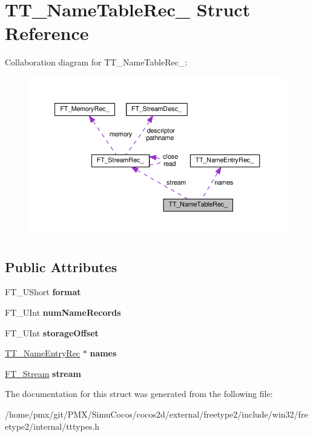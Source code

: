 \hypertarget{structTT__NameTableRec__}{}\section{T\+T\+\_\+\+Name\+Table\+Rec\+\_\+ Struct Reference}
\label{structTT__NameTableRec__}


Collaboration diagram for T\+T\+\_\+\+Name\+Table\+Rec\+\_\+\+:
\nopagebreak
\begin{figure}[H]
\begin{center}
\leavevmode
\includegraphics[width=350pt]{structTT__NameTableRec____coll__graph}
\end{center}
\end{figure}
\subsection*{Public Attributes}
\begin{DoxyCompactItemize}
\item 
\mbox{\label{structTT__NameTableRec___a762c5431cbe285cb7153bb5650710fb0}} 
F\+T\+\_\+\+U\+Short {\bfseries format}
\item 
\mbox{\label{structTT__NameTableRec___a5b565d940b9d02bb69cd19da5cda61b8}} 
F\+T\+\_\+\+U\+Int {\bfseries num\+Name\+Records}
\item 
\mbox{\label{structTT__NameTableRec___a4ed1f4e78e39b2e206411e9ea4d23801}} 
F\+T\+\_\+\+U\+Int {\bfseries storage\+Offset}
\item 
\mbox{\label{structTT__NameTableRec___ae8410a767073a6888bcb414a0cd052b8}} 
\hyperlink{structTT__NameEntryRec__}{T\+T\+\_\+\+Name\+Entry\+Rec} $\ast$ {\bfseries names}
\item 
\mbox{\label{structTT__NameTableRec___a97109aec8cd7ca13f6627f3fee15d48d}} 
\hyperlink{structFT__StreamRec__}{F\+T\+\_\+\+Stream} {\bfseries stream}
\end{DoxyCompactItemize}


The documentation for this struct was generated from the following file\+:\begin{DoxyCompactItemize}
\item 
/home/pmx/git/\+P\+M\+X/\+Simu\+Cocos/cocos2d/external/freetype2/include/win32/freetype2/internal/tttypes.\+h\end{DoxyCompactItemize}
